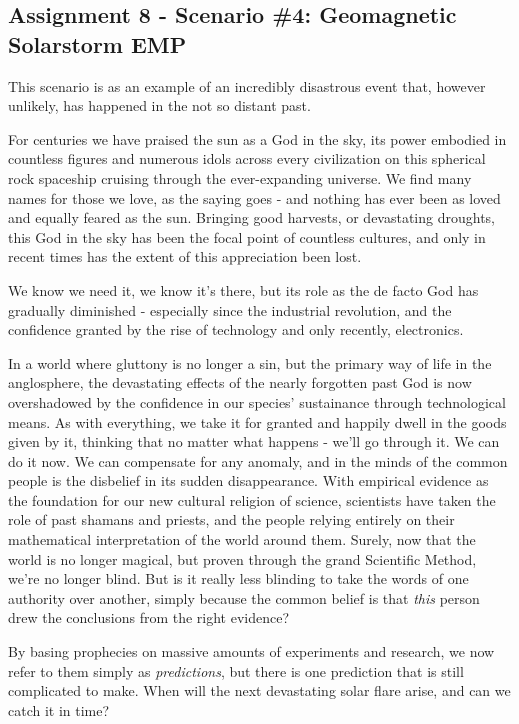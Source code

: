 \subsection{Assignment 8 - Scenario \#4: Geomagnetic Solarstorm EMP}
This scenario is as an example of an incredibly disastrous event that, however unlikely, has happened in the not so distant past. 

For centuries we have praised the sun as a God in the sky, its power embodied in countless figures and numerous idols across every civilization on this spherical rock spaceship cruising through the ever-expanding universe. We find many names for those we love, as the saying goes - and nothing has ever been as loved and equally feared as the sun. Bringing good harvests, or devastating droughts, this God in the sky has been the focal point of countless cultures, and only in recent times has the extent of this appreciation been lost. 

We know we need it, we know it's there, but its role as the de facto God has gradually diminished - especially since the industrial revolution, and the confidence granted by the rise of technology and only recently, electronics. 

In a world where gluttony is no longer a sin, but the primary way of life in the anglosphere, the devastating effects of the nearly forgotten past God is now overshadowed by the confidence in our species' sustainance through technological means. As with everything, we take it for granted and happily dwell in the goods given by it, thinking that no matter what happens - we'll go through it. We can do it now. We can compensate for any anomaly, and in the minds of the common people is the disbelief in its sudden disappearance. With empirical evidence as the foundation for our new cultural religion of science, scientists have taken the role of past shamans and priests, and the people relying entirely on their mathematical interpretation of the world around them. Surely, now that the world is no longer magical, but proven through the grand Scientific Method, we're no longer blind. But is it really less blinding to take the words of one authority over another, simply because the common belief is that \textit{this} person drew the conclusions from the right evidence?

By basing prophecies on massive amounts of experiments and research, we now refer to them simply as \textit{predictions}, but there is one prediction that is still complicated to make. When will the next devastating solar flare arise, and can we catch it in time? 


